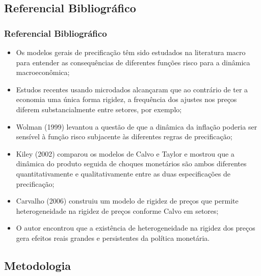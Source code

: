 \documentclass[aspectratio=169]{beamer}
\begin{document}
\subsection{Referencial Bibliográfico}

\begin{frame}\frametitle{Referencial Bibliográfico}
  \begin{itemize}
  \item Os modelos gerais de precificação têm sido estudados na literatura macro para entender as consequências de diferentes funções risco para a dinâmica macroeconômica;
  \item Estudos recentes usando microdados alcançaram que ao contrário de ter a economia uma única forma rigidez, a frequência dos ajustes nos preços diferem substancialmente entre setores, por exemplo;
  \item Wolman (1999) levantou a questão de que a dinâmica da inflação poderia ser sensível à função risco subjacente às diferentes regras de precificação;
  \item Kiley (2002) comparou os modelos de Calvo e Taylor e mostrou que a dinâmica do produto seguida de choques monetários são ambos diferentes quantitativamente e qualitativamente entre as duas especificações de precificação;
  \item Carvalho (2006) construiu um modelo de rigidez de preços que permite heterogeneidade na rigidez de preços conforme Calvo em setores;
  \item O autor encontrou que a existência de heterogeneidade na rigidez dos preços gera efeitos reais grandes e persistentes da política monetária.
  \end{itemize}
\end{frame}

\subsection{Metodologia}
\end{document}
